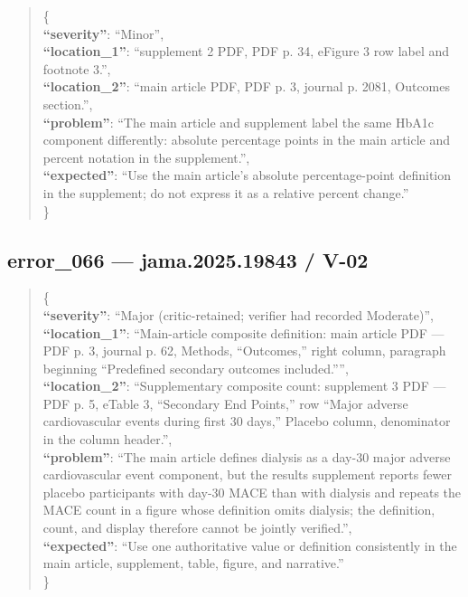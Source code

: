 \documentclass[
  letterpaper,
  9pt]{extreport}
\begin{document}
\begin{quote}
\{\\
\textbf{``severity''}: ``Minor'',\\
\textbf{``location\_1''}: ``supplement 2 PDF, PDF p. 34, eFigure 3 row
label and footnote 3.'',\\
\textbf{``location\_2''}: ``main article PDF, PDF p. 3, journal p. 2081,
Outcomes section.'',\\
\textbf{``problem''}: ``The main article and supplement label the same
HbA1c component differently: absolute percentage points in the main
article and percent notation in the supplement.'',\\
\textbf{``expected''}: ``Use the main article's absolute
percentage-point definition in the supplement; do not express it as a
relative percent change.''\\
\}
\end{quote}

\hypertarget{error_066--jama202519843--v-02}{%
\subsection{error\_066 --- jama.2025.19843 /
V-02}\label{error_066--jama202519843--v-02}}

\begin{quote}
\{\\
\textbf{``severity''}: ``Major (critic-retained; verifier had recorded
Moderate)'',\\
\textbf{``location\_1''}: ``Main-article composite definition: main
article PDF --- PDF p. 3, journal p. 62, Methods, ``Outcomes,'' right
column, paragraph beginning ``Predefined secondary outcomes
included.'''',\\
\textbf{``location\_2''}: ``Supplementary composite count: supplement 3
PDF --- PDF p. 5, eTable 3, ``Secondary End Points,'' row ``Major
adverse cardiovascular events during first 30 days,'' Placebo column,
denominator in the column header.'',\\
\textbf{``problem''}: ``The main article defines dialysis as a day-30
major adverse cardiovascular event component, but the results supplement
reports fewer placebo participants with day-30 MACE than with dialysis
and repeats the MACE count in a figure whose definition omits dialysis;
the definition, count, and display therefore cannot be jointly
verified.'',\\
\textbf{``expected''}: ``Use one authoritative value or definition
consistently in the main article, supplement, table, figure, and
narrative.''\\
\}
\end{quote}
\end{document}
